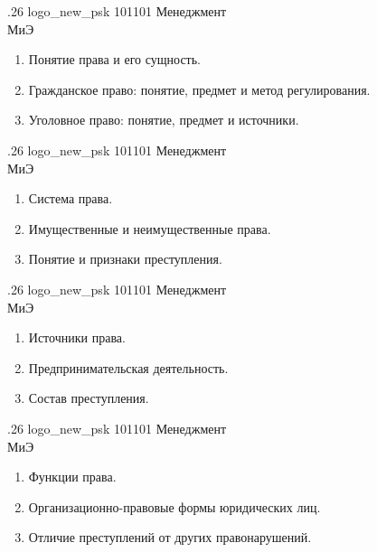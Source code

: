 \documentclass[
	12pt,
	a4paper,
	]
	{article}
\newcommand{\shapkFull}{
	\shapk
		{.26}
		{logo_new_psk}
		{101101}
		{Менеджмент\\}
		{МиЭ}
		{}
}
\begin{document}
\shapkFull
\setcounter{zad}{0}

\begin{enumerate}
	\item Понятие права и его сущность.

	\item Гражданское право: понятие, предмет и метод регулирования.

	\item Уголовное право: понятие, предмет и источники.

\end{enumerate}

\newpage


\shapkFull
\setcounter{zad}{0}

\begin{enumerate}
	\item Система права.

	\item Имущественные и неимущественные права.

	\item Понятие и признаки преступления.

\end{enumerate}

\newpage


\shapkFull
\setcounter{zad}{0}

\begin{enumerate}
	\item Источники права.

	\item Предпринимательская деятельность.

	\item Состав преступления.

\end{enumerate}

\newpage


\shapkFull
\setcounter{zad}{0}

\begin{enumerate}
	\item Функции права.

	\item Организационно-правовые формы юридических лиц.

	\item Отличие преступлений от других правонарушений.

\end{enumerate}
\end{document}
